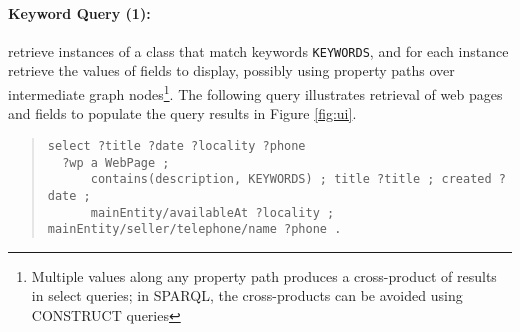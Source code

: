 \paragraph{Keyword Query (1):} 
retrieve instances of a class that match keywords \verb|KEYWORDS|, and for each instance retrieve the values of fields to display, possibly using property paths over intermediate graph nodes\footnote{Multiple values along any property path produces a cross-product of results in select queries; in SPARQL, the cross-products can be avoided using  CONSTRUCT queries}.
The following query illustrates retrieval of web pages and fields to populate the query results in Figure \ref{fig:ui}.
\begin{quote}
{\footnotesize
\begin{verbatim}
select ?title ?date ?locality ?phone
  ?wp a WebPage ; 
      contains(description, KEYWORDS) ; title ?title ; created ?date ;
      mainEntity/availableAt ?locality ; mainEntity/seller/telephone/name ?phone .
\end{verbatim}}
\end{quote}


